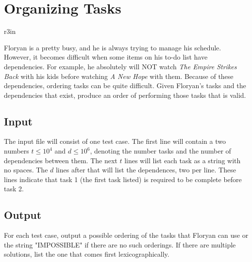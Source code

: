 \documentclass[11pt]{article}
\begin{document}
\section*{Organizing Tasks}


\begin{wrapfigure}{r}{3in}
\vspace{-10pt}
\vspace{-30pt}
\end{wrapfigure}

Floryan is a pretty busy, and he is always trying to manage his schedule. However, it becomes difficult when some items on his to-do list have dependencies. For example, he absolutely will NOT watch \emph{The Empire Strikes Back} with his kids before watching \emph{A New Hope} with them. Because of these dependencies, ordering tasks can be quite difficult. Given Floryan's tasks and the dependencies that exist, produce an order of performing those tasks that is valid.

\subsection*{Input}
The input file will consist of one test case. The first line will contain a two numbers $t \leq 10^4$ and $d \leq 10^6$, denoting the number tasks and the number of dependencies between them. The next $t$ lines will list each task as a string with no spaces. The $d$ lines after that will list the dependences, two per line. These lines indicate that task 1 (the first task listed) is required to be complete before task 2.

\subsection*{Output}

For each test case, output a possible ordering of the tasks that Floryan can use or the string "IMPOSSIBLE" if there are no such orderings. If there are multiple solutions, list the one that comes first lexicographically.
\end{document}
